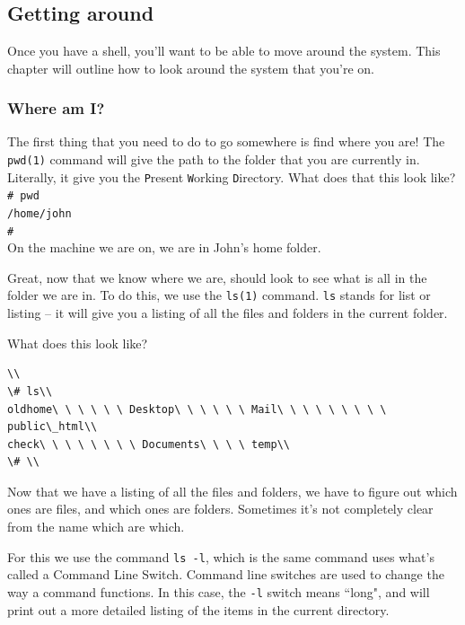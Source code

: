\chapter[The Shell]{}

\section{Getting around}

Once you have a shell, you'll want to be able to move around the system. 
This chapter will outline how to look around the system that you're on.

\subsection{Where am I?}
The first thing that you need to do to go somewhere is find where you are!  
The {\tt pwd(1)} command will give the path to the folder that you are currently in.  
Literally, it give you the {\tt P}resent {\tt W}orking {\tt D}irectory.   
What does that this look like?
{\\
\tt \# pwd\\
/home/john\\
\#\\
}
On the machine we are on, we are in John's home folder.

Great, now that we know where we are, should look to see what is all in the folder we are in. To do this, we use the {\tt ls(1)} command. {\tt ls} stands for list or listing -- it will give you a listing of all the files and folders in the current folder.

What does this look like?
{\tt \begin{verbatim}\\
\# ls\\
oldhome\ \ \ \ \ \ Desktop\ \ \ \ \ \ Mail\ \ \ \ \ \ \ \ \ public\_html\\
check\ \ \ \ \ \ \ \ Documents\ \ \ \ temp\\
\# \\
\end{verbatim}
}

Now that we have a listing of all the files and folders, we have to figure out which ones are files, and which ones are folders.  Sometimes it's not completely clear from the name which are which.

For this we use the command {\tt ls -l}, which is the same command uses what's called a Command Line Switch.  Command line switches are used
to change the way a command functions.  In this case, the {\tt -l} switch means ``long", and will print out a more detailed listing of the items in the current directory.

